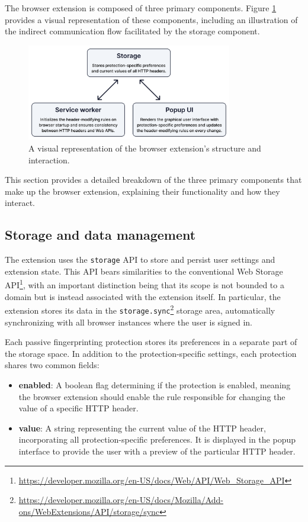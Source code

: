 The browser extension is composed of three primary components. Figure \ref{Figure:VisualRepresentation} provides a visual representation of these components, including an illustration of the indirect communication flow facilitated by the storage component.

\begin{figure}[H]
    \centering
    \includegraphics[width=0.8\textwidth]{obrazky-figures/components_schema}
    \caption{A visual representation of the browser extension's structure and interaction.}
    \label{Figure:VisualRepresentation}
\end{figure}

This section provides a detailed breakdown of the three primary components that make up the browser extension, explaining their functionality and how they interact.

\subsection{Storage and data management}

The extension uses the \texttt{storage} API to store and persist user settings and extension state. This API bears similarities to the conventional Web Storage API\footnote{\url{https://developer.mozilla.org/en-US/docs/Web/API/Web_Storage_API}}, with an important distinction being that its scope is not bounded to a domain but is instead associated with the extension itself. In particular, the extension stores its data in the \texttt{storage.sync}\footnote{\url{https://developer.mozilla.org/en-US/docs/Mozilla/Add-ons/WebExtensions/API/storage/sync}} storage area, automatically synchronizing with all browser instances where the user is signed in.

Each passive fingerprinting protection stores its preferences in a separate part of the storage space. In addition to the protection-specific settings, each protection shares two common fields:

\begin{itemize}
	\item \textbf{enabled}: A boolean flag determining if the protection is enabled, meaning the browser extension should enable the rule responsible for changing the value of a specific HTTP header.
	\item \textbf{value}: A string representing the current value of the HTTP header, incorporating all protection-specific preferences. It is displayed in the popup interface to provide the user with a preview of the particular HTTP header.
\end{itemize}


